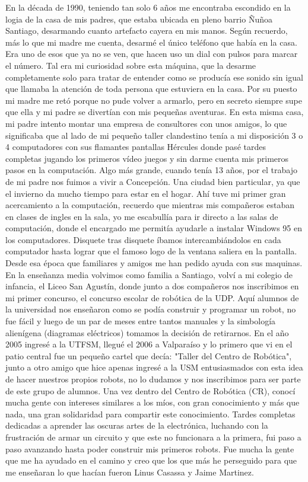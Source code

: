 En la década de 1990, teniendo tan solo 6 años me encontraba escondido en la logia de la casa de mis padres, que estaba ubicada en pleno barrio Ñuñoa Santiago, desarmando cuanto artefacto cayera en mis manos. Según recuerdo, más lo que mi madre me cuenta, desarmé el único teléfono que había en la casa. Era uno de esos que ya no se ven, que hacen uso un dial con pulsos para marcar el número. Tal era mi curiosidad sobre esta máquina, que la desarme completamente solo para tratar de entender como se producía ese sonido sin igual que llamaba la atención de toda persona que estuviera en la casa. Por su puesto mi madre me retó porque no pude volver a armarlo, pero en secreto siempre supe que ella y mi padre se divertían con mis pequeñas aventuras. En esta misma casa, mi padre intento montar una empresa de consultores con unos amigos, lo que significaba que al lado de mi pequeño taller clandestino tenía a mi disposición 3 o 4 computadores con sus flamantes pantallas Hércules donde pasé tardes completas jugando los primeros vídeo juegos y sin darme cuenta mis primeros pasos en la computación. Algo más grande, cuando tenía 13 años, por el trabajo de mi padre nos fuimos a vivir a Concepción. Una ciudad bien particular, ya que el invierno da mucho tiempo para estar en el hogar. Ahí tuve mi primer gran acercamiento a la computación, recuerdo que mientras mis compañeros estaban en clases de ingles en la sala, yo me escabullía para ir directo a las salas de computación, donde el encargado me permitía ayudarle a instalar Windows 95 en los computadores. Disquete tras disquete íbamos intercambiándolos en cada computador hasta lograr que el famoso logo de la ventana saliera en la pantalla. Desde esa época que familiares y amigos me han pedido ayuda con sus maquinas. En la enseñanza media volvimos como familia a Santiago, volví a mi colegio de infancia, el Liceo San Agustín, donde junto a dos compañeros nos inscribimos en mi primer concurso, el concurso escolar de robótica de la UDP. Aquí alumnos de la universidad nos enseñaron como se podía construir y programar un robot, no fue fácil y luego de un par de meses entre tantos manuales y la simbología alienígena (diagramas eléctricos) tomamos la decisión de retirarnos. En el año 2005 ingresé a la UTFSM, llegué el 2006 a Valparaíso y lo primero que vi en el patio central fue un pequeño cartel que decía: "Taller del Centro de Robótica", junto a otro amigo que hice apenas ingresé a la USM entusiasmados con esta idea de hacer nuestros propios robots, no lo dudamos y nos inscribimos para ser parte de este grupo de alumnos. Una vez dentro del Centro de Robótica (CR), conocí mucha gente con intereses similares a los míos, con gran conocimiento y más que nada, una gran solidaridad para compartir este conocimiento. Tardes completas dedicadas a aprender las oscuras artes de la electrónica, luchando con la frustración de armar un circuito y que este no funcionara a la primera, fui paso a paso avanzando hasta poder construir mis primeros robots. Fue mucha la gente que me ha ayudado en el camino y creo que los que más he perseguido para que me enseñaran lo que hacían fueron Linus Casassa y Jaime Martinez. 


